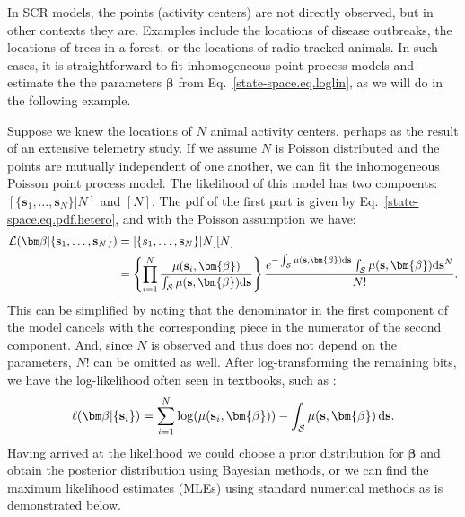 In SCR models, the points (activity centers) are not directly
observed, but in other contexts they are. Examples include the
locations of disease outbreaks, the locations of trees in a forest, or
the locations of radio-tracked animals. In such cases, it is
straightforward to fit inhomogeneous point process models and estimate the
the parameters $\bm \beta$ from Eq.~\ref{state-space.eq.loglin}, as we
will do in the following example. %

Suppose we knew the locations of $N$ animal activity
centers, perhaps as the result of an extensive telemetry study. %
If we assume $N$ is Poisson distributed and the points are
mutually independent of one another, we can fit the
inhomogeneous Poisson point process model. The likelihood of this
model has two compoents: $[\{\mathbf{s}_1, \ldots, \mathbf{s}_N\}|N]$
and $[N]$. The pdf of the first part is given by
Eq.~\ref{state-space.eq.pdf.hetero},
and with the Poisson assumption we have:
\begin{align*}
\mathcal{L}({\bm \beta} | \{{\bf s}_1, \ldots, \mathbf{s}_N\})
&= [\{s_1, \ldots, \mathbf{s}_N\}|N][N] \\
&= \left\{\prod_{i=1}^N
  \frac{\mu(\mathbf{s}_i,\bm{\beta})}{\int_{\mathcal{S}}\mu(\mathbf{s},\bm{\beta})\mathrm{d}\mathbf{s}} \right\}
  \frac{e^{-\int_{\mathcal{S}}\mu(\mathbf{s},\bm{\beta})\mathrm{d}\mathbf{s}}
    \int_{\mathcal{S}}\mu(\mathbf{s},\bm{\beta})\mathrm{d}\mathbf{s}^N}{N!}.
\end{align*}
This can be simplified by noting that the denominator in the first
component of the model cancels with the corresponding piece in the
numerator of the second component. And, since $N$ is observed and
thus does not depend on the parameters, $N!$ can be omitted as
well. After log-transforming the remaining bits, we have the
log-likelihood often seen in textbooks, such as \citet[pg. 104]{diggle:2003}:
\[
\ell({\bm \beta} | \{{\bf s}_i\}) = \sum_{i=1}^N
\log(\mu(\mathbf{s}_i, \bm{\beta})) - \int_{\mathcal{S}} \mu(\mathbf{s}, \bm{\beta}) \, \mathrm{d} \mathbf{s} .
\]
Having arrived at the likelihood we could choose a prior distribution for
$\bm \beta$ and obtain the posterior distribution %
using Bayesian methods, or we can find the maximum likelihood
estimates (MLEs) using standard numerical methods as is demonstrated
below.

